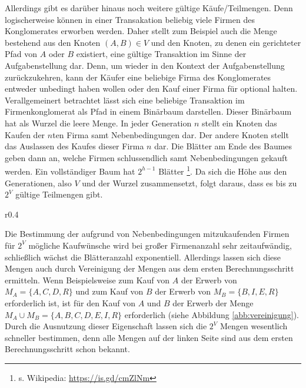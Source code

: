 Allerdings gibt es darüber hinaus noch weitere gültige Käufe/Teilmengen. Denn logischerweise können in einer Transakation beliebig viele Firmen des Konglomerates erworben werden. Daher stellt zum Beispiel auch die Menge bestehend aus den Knoten \((A, B) \in V\) und den Knoten, zu denen ein gerichteter Pfad von \(A\) oder \(B\) existiert, eine gültige Transaktion im Sinne der Aufgabenstellung dar. Denn, um wieder in den Kontext der Aufgabenstellung zurückzukehren, kann der Käufer eine beliebige Firma des Konglomerates entweder unbedingt haben wollen oder den Kauf einer Firma für optional halten. 
Verallgemeinert betrachtet lässt sich eine beliebige Transaktion im Firmenkonglomerat als Pfad in einem Binärbaum darstellen. Dieser Binärbaum hat als Wurzel die leere Menge. In jeder Generation \(n\) stellt ein Knoten das Kaufen der \(n\)ten Firma samt Nebenbedingungen dar. Der andere Knoten stellt das Auslassen des Kaufes dieser Firma \(n\) dar. Die Blätter am Ende des Baumes geben dann an, welche Firmen schlussendlich samt Nebenbedingungen gekauft werden. Ein vollständiger Baum hat \(2^{h-1}\) Blätter \footnote{s. Wikipedia: \url{https://is.gd/cmZlNm}}. Da sich die Höhe aus den Generationen, also \(V\) und der Wurzel zusammensetzt, folgt daraus, dass es bis zu \(2^V\) gültige Teilmengen gibt.

\begin{wrapfigure}{r}{0.4\textwidth}
  \begin{center}
    
  \end{center}
  \caption{Beispielgraph}
  \label{abb:vereinigung}
\end{wrapfigure}

Die Bestimmung der aufgrund von Nebenbedingungen mitzukaufenden Firmen für \(2^V\) mögliche Kaufwünsche wird bei großer Firmenanzahl sehr zeitaufwändig, schließlich wächst die Blätteranzahl exponentiell. Allerdings lassen sich diese Mengen auch durch Vereinigung der Mengen aus dem ersten Berechnungsschritt ermitteln. Wenn Beispielsweise zum Kauf von \(A\) der Erwerb von \(M_A=\{A, C, D, R\}\) und zum Kauf von \(B\) der Erwerb von \(M_B = \{B, I, E, R\}\) erforderlich ist, ist für den Kauf von \(A\) und \(B\) der Erwerb der Menge \(M_A \cup M_B = \{A, B, C, D, E, I, R\}\) erforderlich (siehe Abbildung \ref{abb:vereinigung}). Durch die Ausnutzung dieser Eigenschaft lassen sich die \(2^V\) Mengen wesentlich schneller bestimmen, denn alle Mengen auf der linken Seite sind aus dem ersten Berechnungsschritt schon bekannt.

